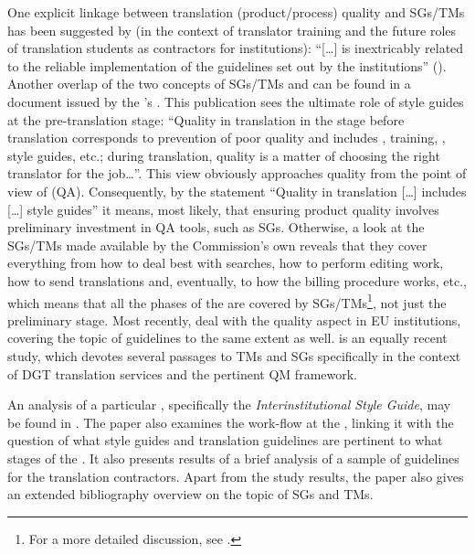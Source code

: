 \documentclass[output=paper]{langsci/langscibook}
\begin{document}
One explicit linkage between translation (product/process) quality and SGs/TMs has been suggested by \citeauthor{Sosoni2011} (in the context of translator training and the future roles of translation students as contractors for  institutions): “[…]  is inextricably related to the reliable implementation of the guidelines set out by the  institutions” (\citeyear[100]{Sosoni2011}). Another overlap of the two concepts of SGs/TMs and  can be found in a document issued by the ’s \citet[17]{DGT2012}. This publication sees the ultimate role of style guides at the pre-translation stage: “Quality in translation in the stage before translation corresponds to prevention of poor quality and includes , training, , style guides, etc.; during translation, quality is a matter of choosing the right translator for the job…”. This view obviously approaches quality from the point of view of  (QA). Consequently, by the statement “Quality in translation […] includes […] style guides” it means, most likely, that ensuring product quality involves preliminary investment in QA tools, such as SGs. Otherwise, a look at the SGs/TMs made available by the Commission’s own  reveals that they cover everything from how to deal best with searches, how to perform editing work, how to send translations and, eventually, to how the billing procedure works, etc., which means that all the phases of the  are covered by SGs/TMs\footnote{For a more detailed discussion, see \citealt{Svoboda2008}.}, not just the preliminary stage.
Most recently, \citet{Druganforthcoming} deal with the quality aspect in EU institutions, covering the topic of guidelines to the same extent as well. \citet{Strandvik2017} is an equally recent study, which devotes several passages to TMs and SGs specifically in the context of DGT translation services and the pertinent QM framework.

\largerpage
An analysis of a particular , specifically the  \textit{Interinstitutional Style Guide}, may be found in \citet{Svoboda2013}. The paper also examines the work-flow at the , linking it with the question of what style guides and translation guidelines are pertinent to what stages of the . It also presents results of a brief analysis of a sample of guidelines for the  translation contractors. Apart from the study results, the paper also gives an extended bibliography overview on the topic of SGs and TMs.
\end{document}
